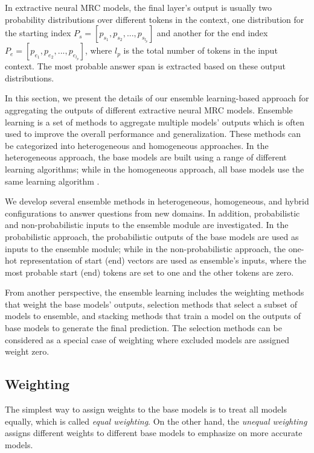 \documentclass[review]{elsarticle}
\begin{document}
In extractive neural MRC models, the final layer's output is usually two probability distributions over different tokens in the context, one distribution for the starting index $P_{s}=[p_{s_{1}},p_{s_{2}},...,p_{s_{l_{p}}}]$ and another for the end index $P_{e}=[p_{e_{1}},p_{e_{2}},...,p_{e_{l_{p}}}]$, where $l_{p}$ is the total number of tokens in the input context. The most probable answer span is extracted based on these output distributions.

In this section, we present the details of our ensemble learning-based approach for aggregating the outputs of different extractive neural MRC models. Ensemble learning is a set of methods to aggregate multiple models' outputs which is often used to improve the overall performance and generalization. These methods can be categorized into heterogeneous and homogeneous approaches. In the heterogeneous approach, the base models are built using a range of different learning algorithms; while in the homogeneous approach, all base models use the same learning algorithm \cite{RN255}.

We develop several ensemble methods in heterogeneous, homogeneous, and hybrid configurations to answer questions from new domains. In addition, probabilistic and non-probabilistic inputs to the ensemble module are investigated. In the probabilistic approach, the probabilistic outputs of the base models are used as inputs to the ensemble module; while in the non-probabilistic approach, the one-hot representation of start (end) vectors are used as ensemble's inputs, where the most probable start (end) tokens are set to one and the other tokens are zero. 

From another perspective, the ensemble learning includes the weighting methods \cite{RN256,RN261} that weight the base models' outputs, selection methods \cite{RN257,RN258} that select a subset of models to ensemble, and stacking methods \cite{RN259,RN260} that train a model on the outputs of base models to generate the final prediction. The selection methods can be considered as a special case of weighting where excluded models are assigned weight zero. 


\subsection{Weighting}
The simplest way to assign weights to the base models is to treat all models equally, which is called \textit{equal weighting}. On the other hand, the \textit{unequal weighting} assigns different weights to different base models to emphasize on more accurate models. 
\end{document}
